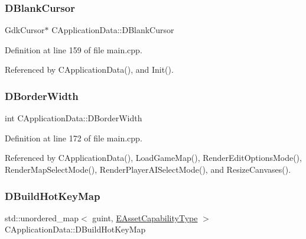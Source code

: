 \hypertarget{classCApplicationData_a34b9a8bb2c85704fb4bd07209acdcdc4}{}\label{classCApplicationData_a34b9a8bb2c85704fb4bd07209acdcdc4} 
\subsubsection{\texorpdfstring{D\+Blank\+Cursor}{DBlankCursor}}
{\footnotesize\ttfamily Gdk\+Cursor$\ast$ C\+Application\+Data\+::\+D\+Blank\+Cursor\hspace{0.3cm}{\ttfamily [protected]}}



Definition at line 159 of file main.\+cpp.



Referenced by C\+Application\+Data(), and Init().

\hypertarget{classCApplicationData_a566b69c72fa982c6ecf8e47dc21df489}{}\label{classCApplicationData_a566b69c72fa982c6ecf8e47dc21df489} 
\subsubsection{\texorpdfstring{D\+Border\+Width}{DBorderWidth}}
{\footnotesize\ttfamily int C\+Application\+Data\+::\+D\+Border\+Width\hspace{0.3cm}{\ttfamily [protected]}}



Definition at line 172 of file main.\+cpp.



Referenced by C\+Application\+Data(), Load\+Game\+Map(), Render\+Edit\+Options\+Mode(), Render\+Map\+Select\+Mode(), Render\+Player\+A\+I\+Select\+Mode(), and Resize\+Canvases().

\hypertarget{classCApplicationData_accd0e5b0bf28b34b8cce8148eb13de31}{}\label{classCApplicationData_accd0e5b0bf28b34b8cce8148eb13de31} 
\subsubsection{\texorpdfstring{D\+Build\+Hot\+Key\+Map}{DBuildHotKeyMap}}
{\footnotesize\ttfamily std\+::unordered\+\_\+map$<$ guint, \hyperlink{GameDataTypes_8h_a35b98ce26aca678b03c6f9f76e4778ce}{E\+Asset\+Capability\+Type} $>$ C\+Application\+Data\+::\+D\+Build\+Hot\+Key\+Map\hspace{0.3cm}{\ttfamily [protected]}}



